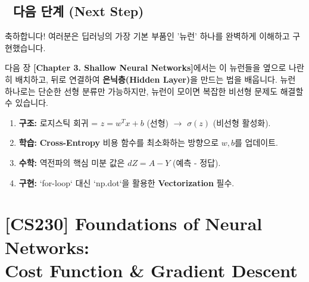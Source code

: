 \documentclass[11pt,a4paper]{book}
\theoremstyle{definition}
\begin{document}
\section*{🔗 다음 단계 (Next Step)}
축하합니다! 여러분은 딥러닝의 가장 기본 부품인 '뉴런' 하나를 완벽하게 이해하고 구현했습니다.

다음 장 \textbf{[Chapter 3. Shallow Neural Networks]}에서는 이 뉴런들을 옆으로 나란히 배치하고, 뒤로 연결하여 \textbf{은닉층(Hidden Layer)}을 만드는 법을 배웁니다. 뉴런 하나로는 단순한 선형 분류만 가능하지만, 뉴런이 모이면 복잡한 비선형 문제도 해결할 수 있습니다.

\vspace{0.5cm}

\begin{summarybox}[title={단원 요약 (Cheat Sheet)}]
\begin{enumerate}
    \item \textbf{구조:} 로지스틱 회귀 = $z = w^Tx + b$ (선형) $\to$ $\sigma(z)$ (비선형 활성화).
    \item \textbf{학습:} \textbf{Cross-Entropy} 비용 함수를 최소화하는 방향으로 $w, b$를 업데이트.
    \item \textbf{수학:} 역전파의 핵심 미분 값은 $dZ = A - Y$ (예측 - 정답).
    \item \textbf{구현:} `for-loop` 대신 `np.dot`을 활용한 \textbf{Vectorization} 필수.
\end{enumerate}
\end{summarybox}


\chapter{[CS230] Foundations of Neural Networks: \\ Cost Function \& Gradient Descent}
\label{ch:lecture3}

\end{document}
